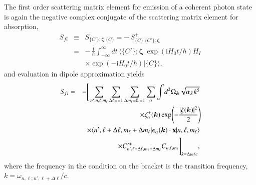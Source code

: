 \documentclass[final,3p,times,twocolumn]{elsarticle3}
\begin{document}
The first order scattering matrix element for emission of a coherent photon 
state is again the negative complex conjugate of the 
scattering matrix element for absorption,
\begin{eqnarray}\nonumber
S_{\!fi}&\equiv& S_{\{C'\};\bm{\zeta}|\{C\}}=-\,S^+_{\{C\}|\{C'\};\bm{\zeta}}
\\ \nonumber
&=&-\,\frac{\mathrm{i}}{\hbar}\int_{-\infty}^\infty\!dt\,\bm{\langle}
\{C'\};\bm{\zeta}\bm{|}
\exp(\mathrm{i}H_0t/\hbar) H_I
\\ \label{eq:linec1}
&&\times\exp(-\mathrm{i}H_0t/\hbar)
\bm{|}\{C\}\bm{\rangle},
\end{eqnarray}
and evaluation in dipole approximation yields 
\begin{eqnarray}\nonumber
S_{\!fi}&=&-\Bigg[\sum_{n',n,\ell,m_\ell}\sum_{\Delta\ell=\pm 1}\sum_{\Delta m_\ell=0,\pm 1}
\sum_\alpha\int\!d^2\Omega_{\bm{k}} \sqrt{\alpha_S k^5}
\\ \nonumber
&&\times
\zeta^+_\alpha(\bm{k})
\exp\!\left(-\frac{|\zeta(\bm{k})|^2}{2}\right)\!
\\ \nonumber
&&\times
\langle n',\ell+\Delta\ell,m_\ell+\Delta m_\ell|
\bm{\epsilon}_\alpha(\bm{k})\cdot\mathrm{\bf x}|n,\ell,m_\ell\rangle
\\ \label{eq:linec3}
&&\times
C'^+_{n',\ell+\Delta\ell,m_\ell+\Delta m_\ell}C_{n,\ell,m_\ell}\Bigg]_{k=\Delta\omega/c},
\end{eqnarray}
where the frequency in the condition on the bracket is the
transition frequency, $k=\omega_{n,\ell;n',\ell+\Delta\ell}/c$.
\end{document}
